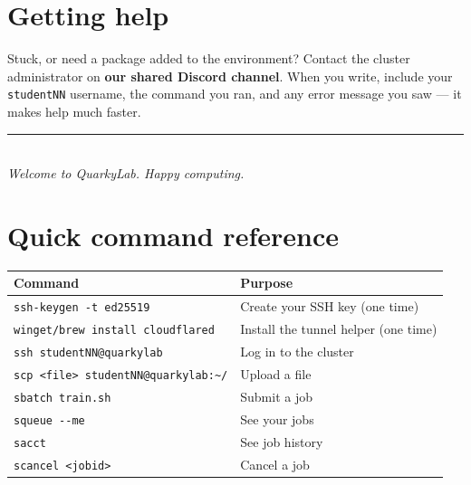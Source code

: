 \documentclass[11pt]{article}
\newcommand{\LabName}{QuarkyLab}                       %
\newcommand{\LabHost}{quarkylab}                       %
\newcommand{\ContactVia}{our shared Discord channel}   %
\newcommand{\code}[1]{\texttt{#1}}
\begin{document}
\section{Getting help}
Stuck, or need a package added to the environment? Contact the cluster administrator on \textbf{\ContactVia}. When you write, include your \code{studentNN} username, the command you ran, and any error message you saw --- it makes help much faster.

\vspace{1em}
\begin{center}
{\color{quarkA}\rule{0.5\linewidth}{1pt}}\\[0.4cm]
{\itshape Welcome to \LabName{}. Happy computing.}
\end{center}

\appendix
\section{Quick command reference}
\begin{center}
\begin{tabularx}{\linewidth}{@{}l X@{}}
\toprule
\textbf{Command} & \textbf{Purpose} \\
\midrule
\code{ssh-keygen -t ed25519} & Create your SSH key (one time) \\
\code{winget/brew install cloudflared} & Install the tunnel helper (one time) \\
\code{ssh studentNN@\LabHost} & Log in to the cluster \\
\code{scp <file> studentNN@\LabHost:\textasciitilde/} & Upload a file \\
\code{sbatch train.sh} & Submit a job \\
\code{squeue -{}-me} & See your jobs \\
\code{sacct} & See job history \\
\code{scancel <jobid>} & Cancel a job \\
\bottomrule
\end{tabularx}
\end{center}
\end{document}
